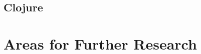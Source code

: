 \documentclass[10pt,a4paper]{scrartcl}
\begin{document}
\subsection{Clojure}
\section{Areas for Further Research}
%

\clearpage
\begin{appendices}
%
\end{appendices}

\printbibliography%
\end{document}

